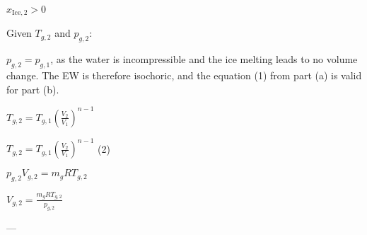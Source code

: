 \( x_{\text{Ice},2} > 0 \)  

Given \( T_{g,2} \) and \( p_{g,2} \):  

\( p_{g,2} = p_{g,1} \), as the water is incompressible and the ice melting leads to no volume change. The EW is therefore isochoric, and the equation (1) from part (a) is valid for part (b).  

\( T_{g,2} = T_{g,1} \left(\frac{V_2}{V_1}\right)^{n-1} \)  

\( T_{g,2} = T_{g,1} \left(\frac{V_2}{V_1}\right)^{n-1} \) (2)  

\( p_{g,2} V_{g,2} = m_g R T_{g,2} \)  

\( V_{g,2} = \frac{m_g R T_{g,2}}{p_{g,2}} \)  

---